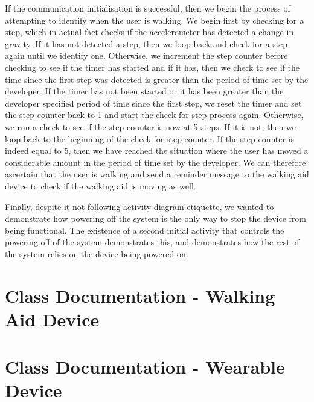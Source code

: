                 If the communication initialisation is successful, then we begin the process of attempting to identify when the user is walking. We begin first by checking for a step, which in actual fact checks if the accelerometer has detected a change in gravity. If it has not detected a step, then we loop back and check for a step again until we identify one. Otherwise, we increment the step counter before checking to see if the timer has started and if it has, then we check to see if the time since the first step was detected is greater than the period of time set by the developer. If the timer has not been started or it has been greater than the developer specified period of time since the first step, we reset the timer and set the step counter back to 1 and start the check for step process again. Otherwise, we run a check to see if the step counter is now at 5 steps. If it is not, then we loop back to the beginning of the check for step counter. If the step counter is indeed equal to 5, then we have reached the situation where the user has moved a considerable amount in the period of time set by the developer. We can therefore ascertain that the user is walking and send a reminder message to the walking aid device to check if the walking aid is moving as well.

                Finally, despite it not following activity diagram etiquette, we wanted to demonstrate how powering off the system is the only way to stop the device from being functional. The existence of a second initial activity that controls the powering off of the system demonstrates this, and demonstrates how the rest of the system relies on the device being powered on.

                \newpage

    \section{Class Documentation - Walking Aid Device}
    \label{sec:class_documentation_walk_aid}\mbox{}

        
        \newpage
        
        \newpage
        
        \newpage
        
        \newpage
        
        \newpage
        
        \newpage

    \section{Class Documentation - Wearable Device}
    \label{sec:class_documentation_wearable}\mbox{}

        
        \newpage
        
        \newpage
        
        \newpage
        
        \newpage